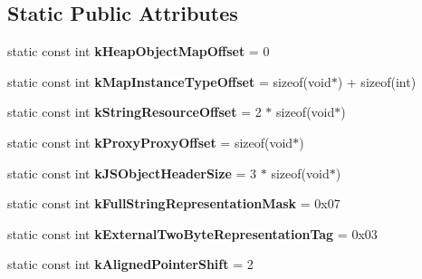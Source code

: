 \subsection*{Static Public Attributes}
\begin{DoxyCompactItemize}
\item 
\hypertarget{classv8_1_1internal_1_1_internals_a0902a596b5656b4592157eaacc020512}{}static const int {\bfseries k\+Heap\+Object\+Map\+Offset} = 0\label{classv8_1_1internal_1_1_internals_a0902a596b5656b4592157eaacc020512}

\item 
\hypertarget{classv8_1_1internal_1_1_internals_a39ea290dfaa9de300bd79aa73a874a88}{}static const int {\bfseries k\+Map\+Instance\+Type\+Offset} = sizeof(void$\ast$) + sizeof(int)\label{classv8_1_1internal_1_1_internals_a39ea290dfaa9de300bd79aa73a874a88}

\item 
\hypertarget{classv8_1_1internal_1_1_internals_a8c2b35069864f567ca0c571310dd90a1}{}static const int {\bfseries k\+String\+Resource\+Offset} = 2 $\ast$ sizeof(void$\ast$)\label{classv8_1_1internal_1_1_internals_a8c2b35069864f567ca0c571310dd90a1}

\item 
\hypertarget{classv8_1_1internal_1_1_internals_a2f7609ff68b17c9fc15d58bd2dee47aa}{}static const int {\bfseries k\+Proxy\+Proxy\+Offset} = sizeof(void$\ast$)\label{classv8_1_1internal_1_1_internals_a2f7609ff68b17c9fc15d58bd2dee47aa}

\item 
\hypertarget{classv8_1_1internal_1_1_internals_af8faf3ff3271d26bafa6ca0ea87e2a57}{}static const int {\bfseries k\+J\+S\+Object\+Header\+Size} = 3 $\ast$ sizeof(void$\ast$)\label{classv8_1_1internal_1_1_internals_af8faf3ff3271d26bafa6ca0ea87e2a57}

\item 
\hypertarget{classv8_1_1internal_1_1_internals_a5c39a86b30463928ea719def66916507}{}static const int {\bfseries k\+Full\+String\+Representation\+Mask} = 0x07\label{classv8_1_1internal_1_1_internals_a5c39a86b30463928ea719def66916507}

\item 
\hypertarget{classv8_1_1internal_1_1_internals_a73faf917416d2519b65c7255e77a74ce}{}static const int {\bfseries k\+External\+Two\+Byte\+Representation\+Tag} = 0x03\label{classv8_1_1internal_1_1_internals_a73faf917416d2519b65c7255e77a74ce}

\item 
\hypertarget{classv8_1_1internal_1_1_internals_a3a4dd65781f6eee3e625f07e5bbe0c37}{}static const int {\bfseries k\+Aligned\+Pointer\+Shift} = 2\label{classv8_1_1internal_1_1_internals_a3a4dd65781f6eee3e625f07e5bbe0c37}


\end{DoxyCompactItemize}
